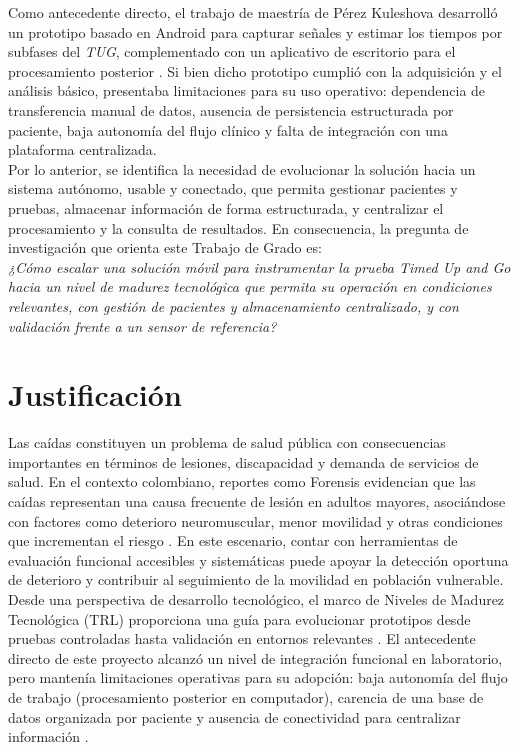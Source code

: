 \documentclass[12pt]{report}
\begin{document}
\begin{justify}
    Como antecedente directo, el trabajo de maestría de Pérez Kuleshova desarrolló un prototipo basado en Android para capturar señales y estimar los tiempos por subfases del \textit{TUG}, complementado con un aplicativo de escritorio para el procesamiento posterior \cite{Sistema-portable-TUG-AKuleshov}. Si bien dicho prototipo cumplió con la adquisición y el análisis básico, presentaba limitaciones para su uso operativo: dependencia de transferencia manual de datos, ausencia de persistencia estructurada por paciente, baja autonomía del flujo clínico y falta de integración con una plataforma centralizada.\\

    Por lo anterior, se identifica la necesidad de evolucionar la solución hacia un sistema autónomo, usable y conectado, que permita gestionar pacientes y pruebas, almacenar información de forma estructurada, y centralizar el procesamiento y la consulta de resultados. En consecuencia, la pregunta de investigación que orienta este Trabajo de Grado es:\\

    \textit{¿Cómo escalar una solución móvil para instrumentar la prueba Timed Up and Go hacia un nivel de madurez tecnológica que permita su operación en condiciones relevantes, con gestión de pacientes y almacenamiento centralizado, y con validación frente a un sensor de referencia?}\\






    \section{Justificación}

    Las caídas constituyen un problema de salud pública con consecuencias importantes en términos de lesiones, discapacidad y demanda de servicios de salud. En el contexto colombiano, reportes como Forensis evidencian que las caídas representan una causa frecuente de lesión en adultos mayores, asociándose con factores como deterioro neuromuscular, menor movilidad y otras condiciones que incrementan el riesgo \cite{Forensis_2020}. En este escenario, contar con herramientas de evaluación funcional accesibles y sistemáticas puede apoyar la detección oportuna de deterioro y contribuir al seguimiento de la movilidad en población vulnerable.\\

    Desde una perspectiva de desarrollo tecnológico, el marco de Niveles de Madurez Tecnológica (TRL) proporciona una guía para evolucionar prototipos desde pruebas controladas hasta validación en entornos relevantes \cite{TRL-ayming}. El antecedente directo de este proyecto alcanzó un nivel de integración funcional en laboratorio, pero mantenía limitaciones operativas para su adopción: baja autonomía del flujo de trabajo (procesamiento posterior en computador), carencia de una base de datos organizada por paciente y ausencia de conectividad para centralizar información \cite{Sistema-portable-TUG-AKuleshov}.\\


\end{justify}
\end{document}
